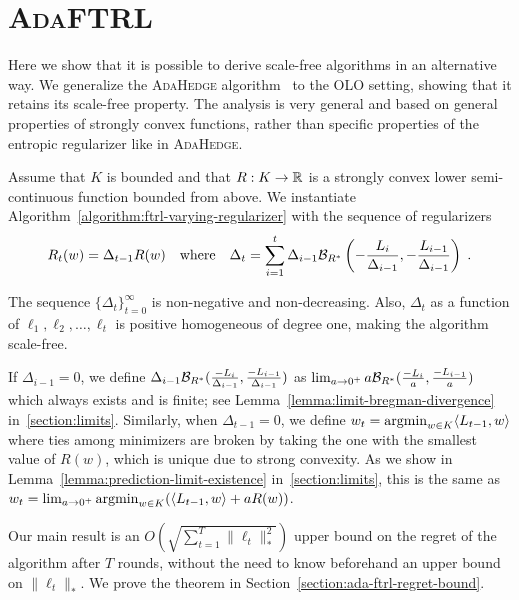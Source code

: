 \section{\textsc{AdaFTRL}}
\label{section:ada-ftrl}

Here we show that it is possible to derive scale-free algorithms in an alternative way. We generalize the \textsc{AdaHedge}
algorithm~\cite{de-Rooij-van-Erven-Grunwald-Koolen-2014} to the OLO setting,
showing that it retains its scale-free property. The analysis is very general
and based on general properties of strongly convex functions, rather than
specific properties of the entropic regularizer like in \textsc{AdaHedge}.

Assume that $K$ is bounded and that $R:K \to \mathbb{R}$ is a strongly convex lower
semi-continuous function bounded from above.  We instantiate
Algorithm~\ref{algorithm:ftrl-varying-regularizer} with the sequence of
regularizers
\begin{equation}
\label{equation:ada-ftrl}
R_t(w) = \Delta_{t-1} R(w)
\quad \text{where}
\quad \Delta_{t}=\sum_{i=1}^{t} \Delta_{i-1} \mathcal{B}_{R^*}\left(- \frac{L_i}{\Delta_{i-1}}, -\frac{L_{i-1}}{\Delta_{i-1}}\right) \; .
\end{equation}

The sequence $\{\Delta_t\}_{t=0}^\infty$ is non-negative and non-decreasing.
Also, $\Delta_t$ as a function of $\ell_1, \ell_2, \dots, \ell_t$ is positive
homogeneous of degree one, making the algorithm scale-free.

If $\Delta_{i-1} = 0$, we define $\Delta_{i-1}
\mathcal{B}_{R^*}(\frac{-L_i}{\Delta_{i-1}}, \frac{-L_{i-1}}{\Delta_{i-1}})$ as
$\lim_{a \to 0^+} a \mathcal{B}_{R^*}(\frac{-L_i}{a}, \frac{-L_{i-1}}{a})$ which
always exists and is finite; see Lemma~\ref{lemma:limit-bregman-divergence}
in~\ref{section:limits}.  Similarly, when $\Delta_{t-1} = 0$, we define $w_t =
\operatorname*{argmin}_{w \in K} \langle L_{t-1}, w \rangle$ where ties among minimizers are
broken by taking the one with the smallest value of $R(w)$, which is unique due
to strong convexity. As we show in Lemma~\ref{lemma:prediction-limit-existence}
in~\ref{section:limits}, this is the same as $w_t = \lim_{a \to 0^+} \operatorname*{argmin}_{w
\in K} (\langle L_{t-1}, w \rangle + aR(w))$.

Our main result is an $O(\sqrt{\sum_{t=1}^T \|\ell_t\|_*^2})$ upper bound on
the regret of the algorithm after $T$ rounds, without the need to know beforehand an upper bound on $\|\ell_t\|_*$.  We prove the theorem in
Section~\ref{section:ada-ftrl-regret-bound}.

